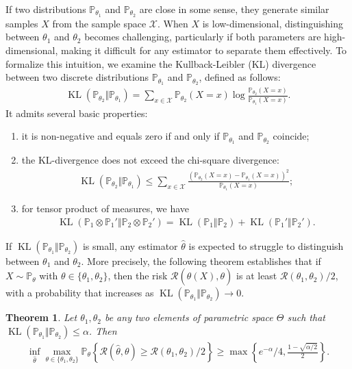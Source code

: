 \documentclass[11pt]{article}
\renewcommand{\P}{\mathbb{P}}
\newcommand{\cR}{\mathcal{R}}
\newcommand{\cX}{\mathcal{X}}
\newcommand{\KL}[2]{\operatorname{KL}\left (#1\Vert #2 \right )}
\newcommand{\<}{\langle}
\renewcommand{\>}{\rangle}
\theoremstyle{plain}
\newtheorem{theorem}{Theorem}
\theoremstyle{definition}
\theoremstyle{remark}
\begin{document}
{If two distributions \(\P_{\theta_1}\) and \(\P_{\theta_2}\) are close in some sense, they generate similar samples \(X\) from the sample space \(\cX\). When \(X\) is low-dimensional, distinguishing between \(\theta_1\) and \(\theta_2\) becomes challenging, particularly if both parameters are high-dimensional, making it difficult for any estimator to separate them effectively. To formalize this intuition, we examine the Kullback-Leibler (KL) divergence between two discrete distributions \(\P_{\theta_1}\) and \(\P_{\theta_2}\), defined as follows:
\begin{align*}
    \KL{\P_{\theta_2}}{\P_{\theta_1}} = \sum_{x \in \cX} \P_{\theta_2}(X = x) \log \frac{\P_{\theta_2}(X = x)}{\P_{\theta_1}(X =x)}.
\end{align*}
It admits several basic properties:
\begin{enumerate}
    \item it is non-negative and equals zero if and only if $\P_{\theta_1}$ and $\P_{\theta_2}$ coincide;
    \item the KL-divergence does not exceed the chi-square divergence:
    \begin{align*}
        \KL{\P_{\theta_2}}{\P_{\theta_1}} \le \sum_{x \in \cX} \frac{\left (\P_{\theta_2}(X = x) -  \P_{\theta_1}(X = x) \right )^2}{\P_{\theta_1}(X = x)};
    \end{align*}
    \item for tensor product of measures, we have
    \begin{align*}
        \KL{\P_1 \otimes \P_1'}{\P_2 \otimes \P_2'} = \KL{\P_1}{\P_2} + \KL{\P_1'}{\P_2'}.
    \end{align*}
\end{enumerate}
If \(\KL{\P_{\theta_1}}{\P_{\theta_2}}\) is small, any estimator \(\widehat{\theta}\) is expected to struggle to distinguish between \(\theta_1\) and \(\theta_2\). More precisely, the following theorem establishes that if \(X \sim \P_{\theta}\) with \(\theta \in \{ \theta_1, \theta_2 \}\), then the risk \(\cR(\widehat{\theta}(X), \theta)\) is at least \(\cR(\theta_1, \theta_2) / 2\), with a probability that increases as \(\KL{\P_{\theta_1}}{\P_{\theta_2}} \to 0\).
\begin{theorem}
    \label{theorem:minimax bounds}
    Let $\theta_1, \theta_2$ be any two elements of parametric space $\Theta$ such that $\KL{\P_{\theta_1}}{\P_{\theta_2}} \le \alpha$. Then
    \begin{align*}
        \inf_{\widehat \theta} \max_{\theta \in \{\theta_1, \theta_2\}} \P_{\theta} \left\{\cR(\widehat{\theta}, \theta) \ge \cR(\theta_1, \theta_2) / 2 \right \} \ge \max \left \{ e^{-\alpha} / 4, \frac{1 - \sqrt{\alpha/2}}{2} \right \}.

\end{align*}
\end{theorem}}
\end{document}
